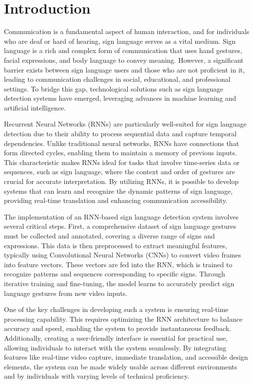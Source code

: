 \chapter{Introduction}

Communication is a fundamental aspect of human interaction, and for individuals who are deaf or hard of hearing, sign language serves as a vital medium. Sign language is a rich and complex form of communication that uses hand gestures, facial expressions, and body language to convey meaning. However, a significant barrier exists between sign language users and those who are not proficient in it, leading to communication challenges in social, educational, and professional settings. To bridge this gap, technological solutions such as sign language detection systems have emerged, leveraging advances in machine learning and artificial intelligence.

Recurrent Neural Networks (RNNs) are particularly well-suited for sign language detection due to their ability to process sequential data and capture temporal dependencies. Unlike traditional neural networks, RNNs have connections that form directed cycles, enabling them to maintain a memory of previous inputs. This characteristic makes RNNs ideal for tasks that involve time-series data or sequences, such as sign language, where the context and order of gestures are crucial for accurate interpretation. By utilizing RNNs, it is possible to develop systems that can learn and recognize the dynamic patterns of sign language, providing real-time translation and enhancing communication accessibility.

The implementation of an RNN-based sign language detection system involves several critical steps. First, a comprehensive dataset of sign language gestures must be collected and annotated, covering a diverse range of signs and expressions. This data is then preprocessed to extract meaningful features, typically using Convolutional Neural Networks (CNNs) to convert video frames into feature vectors. These vectors are fed into the RNN, which is trained to recognize patterns and sequences corresponding to specific signs. Through iterative training and fine-tuning, the model learns to accurately predict sign language gestures from new video inputs.

One of the key challenges in developing such a system is ensuring real-time processing capability. This requires optimizing the RNN architecture to balance accuracy and speed, enabling the system to provide instantaneous feedback. Additionally, creating a user-friendly interface is essential for practical use, allowing individuals to interact with the system seamlessly. By integrating features like real-time video capture, immediate translation, and accessible design elements, the system can be made widely usable across different environments and by individuals with varying levels of technical proficiency.

